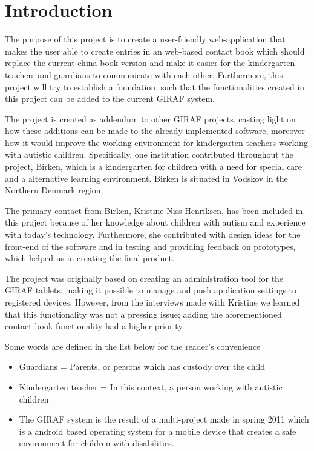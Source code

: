 \chapter{Introduction}

The purpose of this project is to create a user-friendly web-application that makes the user able to create entries in an web-based contact book which should replace the current china book version and make it easier for the kindergarten teachers and guardians to communicate with each other. Furthermore, this project will try to establish a foundation, such that the functionalities created in this project can be added to the current GIRAF system. 

The project is created as addendum to other GIRAF projects, casting light on how these additions can be made to the already implemented software, moreover how it would improve the working environment for kindergarten teachers working with autistic children. 
Specifically, one institution contributed throughout the project, Birken, which is a kindergarten for children with a need for special care and a alternative learning environment. Birken is situated in Vodskov in the Northern Denmark region.

The primary contact from Birken, Kristine Niss-Henriksen, has been included in this project because of her knowledge about children with autism and experience with today's technology. Furthermore, she contributed with design ideas for the front-end of the software and in testing and providing feedback on prototypes, which helped us in creating the final product.

The project was originally based on creating an administration tool for the GIRAF tablets, making it possible to manage and push application settings to registered devices. However, from the interviews made with Kristine we learned that this functionality was not a pressing issue; adding the aforementioned contact book functionality had a higher priority.  

Some words are defined in the list below for the reader's convenience
\begin{itemize}
\item{Guardians = Parents, or persons which has custody over the child}
\item{Kindergarten teacher = In this context, a person working with autistic children}
\item{The GIRAF system is the result of a multi-project made in spring 2011 which is a android based operating system for a mobile device that creates a safe environment for children with disabilities.}
\end{itemize}